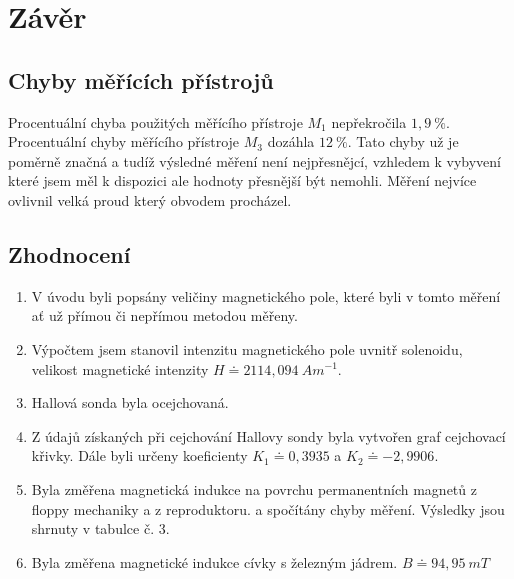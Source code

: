 \section{Závěr}
  
  
  \subsection{Chyby měřících přístrojů}
    \indent\indent
    Procentuální chyba použitých měřícího přístroje $M_1$ nepřekročila $1,9~\%$. Procentuální chyby měřícího přístroje $M_3$ dozáhla $12~\%$. Tato chyby už je poměrně značná a tudíž výsledné měření není nejpřesnějcí, vzhledem k vybyvení které jsem měl k dispozici ale hodnoty přesnější být nemohli. Měření nejvíce ovlivnil velká proud který obvodem procházel.
  
  \subsection{Zhodnocení}
    \begin{enumerate}
      \item
        V úvodu byli popsány veličiny magnetického pole, které byli v tomto měření ať už přímou či nepřímou metodou měřeny.
      \item
        Výpočtem jsem stanovil intenzitu magnetického pole uvnitř solenoidu, velikost magnetické intenzity $H \doteq 2114,094~Am^{-1}$.
      \item
      	Hallová sonda byla ocejchovaná.
      \item
        Z údajů získaných při cejchování Hallovy sondy byla vytvořen graf cejchovací křivky. Dále byli určeny koeficienty $K_1 \doteq 0,3935$ a $K_2 \doteq -2,9906$.
      \item
        Byla změřena magnetická indukce na povrchu permanentních magnetů z floppy mechaniky a z reproduktoru. a spočítány chyby měření. Výsledky jsou shrnuty v tabulce č. 3.
      \item
      	Byla změřena magnetické indukce cívky s železným jádrem. $B \doteq 94,95~mT$
    \end{enumerate}
